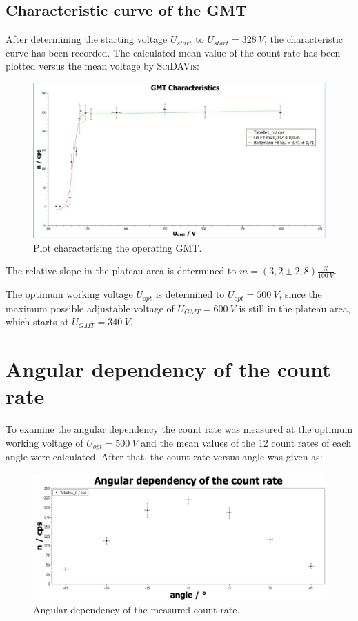 \subsection{Characteristic curve of the GMT}
%
After determining the starting voltage \(U_{start}\) to \(U_{start}=\SI{328}{V}\), the characteristic curve has been
recorded. The calculated mean value
of the count rate has been plotted versus the mean voltage by \textsc{SciDAVis}:\par
\begin{figure}[H]
 \centering
 \includegraphics[width=.9\textwidth]{scidavis/Fig.6_GMT-characteristics.jpg}
 \caption[GMT characteristic]{Plot characterising the operating GMT.}
 \label{fig:gmtCharacteristics}
\end{figure}
The relative slope in the plateau area is determined to \(m=(3,2 \pm 2,8) \frac{\%}{\SI{100}{V}}\).\par
The optimum working voltage \(U_{opt}\) is determined to \(U_{opt}=\SI{500}{V}\), since the maximum possible adjustable
voltage of \(U_{GMT}=\SI{600}{V}\) is still in the plateau area, which starts at \(U_{GMT}=\SI{340}{V}\).
%
\section{Angular dependency of the count rate}
To examine the angular dependency the count rate was measured at the optimum working voltage of
\(U_{opt}=\SI{500}{V}\) and the mean values of the 12 count rates of each angle were calculated. After that, the count
rate versus angle was given as:\par
\begin{figure}[H]
 \centering
 \includegraphics[width=.8\textwidth]{scidavis/Fig.7_Angular dependency of the count rate.jpg}
 \caption[Angular dependency of cps]{Angular dependency of the measured count rate.}
 \label{fig:angularDepCPS}
\end{figure}
%
